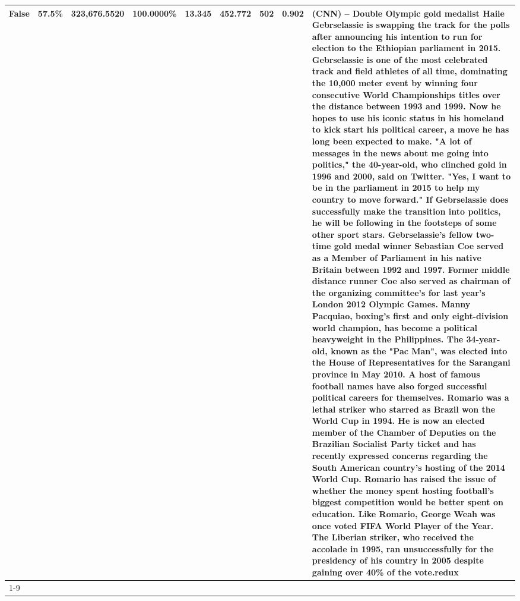 \begin{table}[H]
{\begin{tabular}{lllrlllll}
False & 57.5\% & 323,676.5520 & \bfseries \color{red} 100.0000\% & 13.345 & 452.772 & 502 & 0.902 & (CNN) -- Double Olympic gold medalist Haile Gebrselassie is swapping the track for the polls after announcing his intention to run for election to the Ethiopian parliament in 2015. Gebrselassie is one of the most celebrated track and field athletes of all time, dominating the 10,000 meter event by winning four consecutive World Championships titles over the distance between 1993 and 1999. Now he hopes to use his iconic status in his homeland to kick start his political career, a move he has long been expected to make. "A lot of messages in the news about me going into politics," the 40-year-old, who clinched gold in 1996 and 2000, said on Twitter. "Yes, I want to be in the parliament in 2015 to help my country to move forward." If Gebrselassie does successfully make the transition into politics, he will be following in the footsteps of some other sport stars. Gebrselassie's fellow two-time gold medal winner Sebastian Coe served as a Member of Parliament in his native Britain between 1992 and 1997. Former middle distance runner Coe also served as chairman of the organizing committee's for last year's London 2012 Olympic Games. Manny Pacquiao, boxing's first and only eight-division world champion, has become a political heavyweight in the Philippines. The 34-year-old, known as the "Pac Man", was elected into the House of Representatives for the Sarangani province in May 2010. A host of famous football names have also forged successful political careers for themselves. Romario was a lethal striker who starred as Brazil won the World Cup in 1994. He is now an elected member of the Chamber of Deputies on the Brazilian Socialist Party ticket and has recently expressed concerns regarding the South American country's hosting of the 2014 World Cup. Romario has raised the issue of whether the money spent hosting football's biggest competition would be better spent on education. Like Romario, George Weah was once voted FIFA World Player of the Year. The Liberian striker, who received the accolade in 1995, ran unsuccessfully for the presidency of his country in 2005 despite gaining over 40\% of the vote.redux \\
\cline{1-9}

\end{tabular}}
\end{table}
